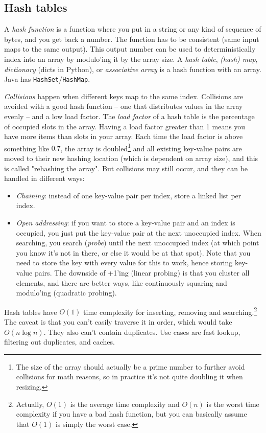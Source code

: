 \documentclass[table, xcdraw]{article}%
\begin{document}
\subsection{Hash tables}

A \emph{hash function} is a function where you put in a string or any kind of sequence of bytes, and you get back a number. The function has to be consistent (same input maps to the same output). This output number can be used to deterministically index into an array by modulo'ing it by the array size. A \emph{hash table}, \emph{(hash) map}, \emph{dictionary} (dicts in Python), or \emph{associative array} is a hash function with an array. Java has \texttt{HashSet}/\texttt{HashMap}.

\emph{Collisions} happen when different keys map to the same index. Collisions are avoided with a good hash function -- one that distributes values in the array evenly -- and a low load factor. The \emph{load factor} of a hash table is the percentage of occupied slots in the array. Having a load factor greater than 1 means you have more items than slots in your array. Each time the load factor is above something like $0.7$, the array is doubled\footnote{The size of the array should actually be a prime number to further avoid collisions for math reasons, so in practice it's not quite doubling it when resizing.} and all existing key-value pairs are moved to their new hashing location (which is dependent on array size), and this is called "rehashing the array". But collisions may still occur, and they can be handled in different ways:

\begin{itemize}
    \item \emph{Chaining}: instead of one key-value pair per index, store a linked list per index.
    \item \emph{Open addressing}: if you want to store a key-value pair and an index is occupied, you just put the key-value pair at the next unoccupied index. When searching, you search (\emph{probe}) until the next unoccupied index (at which point you know it's not in there, or else it would be at that spot). Note that you need to store the key with every value for this to work, hence storing key-value pairs. The downside of +1'ing (linear probing) is that you cluster all elements, and there are better ways, like continuously squaring and modulo'ing (quadratic probing).
\end{itemize}

Hash tables have $O(1)$ time complexity for inserting, removing and searching.\footnote{Actually, $O(1)$ is the average time complexity and $O(n)$ is the worst time complexity if you have a bad hash function, but you can basically assume that $O(1)$ is simply the worst case.} The caveat is that you can't easily traverse it in order, which would take $O(n \log n)$. They also can't contain duplicates. Use cases are fast lookup, filtering out duplicates, and caches.
\end{document}
